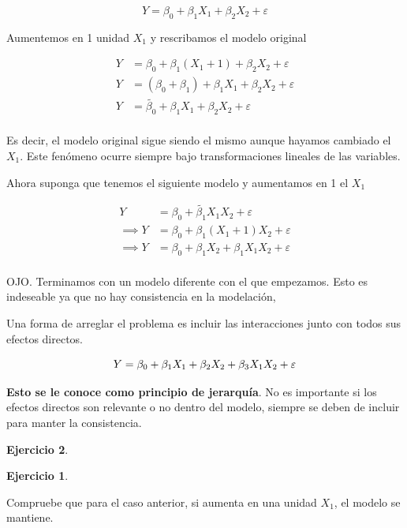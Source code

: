 \documentclass[
  12pt,
]{book}
\theoremstyle{definition}
\theoremstyle{definition}
\theoremstyle{definition}
\newtheorem{exercise}{Ejercicio}[chapter]
\theoremstyle{remark}
\begin{document}
\begin{equation*}
Y = \beta_{0} + \beta_{1} X_{1} + \beta_{2} X_{2} + \varepsilon
\end{equation*}

Aumentemos en 1 unidad \(X_{1}\) y rescribamos el modelo original

\begin{align*}
Y &=  \beta_{0} + \beta_{1} (X_{1}+1) + \beta_{2} X_{2} + \varepsilon \\
Y &=  (\beta_{0} + \beta_{1}) + \beta_{1} X_{1} + \beta_{2} X_{2} + \varepsilon \\
Y &=  \tilde{\beta_{0}} + \beta_{1} X_{1} + \beta_{2} X_{2} + \varepsilon \\
\end{align*}

Es decir, el modelo original sigue siendo el mismo aunque hayamos cambiado el \(X_1\). Este fenómeno ocurre siempre bajo transformaciones lineales de las variables.

Ahora suponga que tenemos el siguiente modelo y aumentamos en 1 el \(X_1\)

\begin{align*}
Y &=  \beta_{0} + \tilde{\beta_{1}} X_{1} X_{2} +\varepsilon \\
\implies Y &=  \beta_{0} + \beta_{1} (X_{1}+1) X_{2} +\varepsilon \\
\implies Y &=  \beta_{0} + \beta_{1}X_{2} +  \beta_{1} X_{1} X_{2} +\varepsilon \\
\end{align*}

OJO. Terminamos con un modelo diferente con el que empezamos. Esto es indeseable ya que no hay consistencia en la modelación,

Una forma de arreglar el problema es incluir las interacciones junto con todos sus efectos directos.

\begin{equation*}
Y =  \beta_{0} + \beta_{1}X_{1} + \beta_{2} X_{2} +  \beta_{3} X_{1} X_{2} +\varepsilon \\
\end{equation*}

\textbf{Esto se le conoce como principio de jerarquía}. No es importante si los efectos directos son relevante o no dentro del modelo, siempre se deben de incluir para manter la consistencia.

\begin{exercise}
\begin{exercise}
\protect\hypertarget{exr:unlabeled-div-47}{}\label{exr:unlabeled-div-47}

\protect\hypertarget{exr:unnamed-chunk-195}{}{\label{exr:unnamed-chunk-195} }Compruebe que para el caso anterior, si aumenta en una unidad \(X_{1}\), el modelo se mantiene.

\end{exercise}
\end{exercise}
\end{document}
